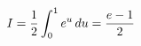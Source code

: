 \documentclass[preview]{standalone}
\begin{document}
\begin{align*}
\special{dvisvgm:raw <g id='unique000'>}I=\frac12\int_0^1e^u\,du=\frac{e-1}{2}\special{dvisvgm:raw </g>}
\end{align*}
\end{document}
